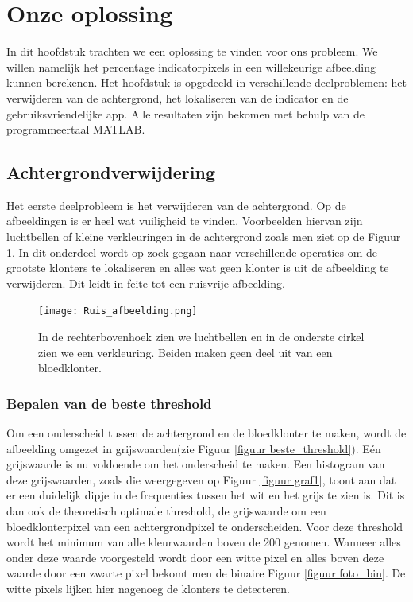 \documentclass[a4paper,kulak]{kulakarticle}
\begin{document}
\section{Onze oplossing}
In dit hoofdstuk trachten we een oplossing te vinden voor ons probleem. We willen namelijk het percentage indicatorpixels in een willekeurige afbeelding kunnen berekenen. Het hoofdstuk is opgedeeld in verschillende deelproblemen: het verwijderen van de achtergrond, het lokaliseren van de indicator en de gebruiksvriendelijke app. Alle resultaten zijn bekomen met behulp van de programmeertaal MATLAB.\cite{matlab}


\subsection{Achtergrondverwijdering} \label{Achtergrondverwijdering}
Het eerste deelprobleem is het verwijderen van de achtergrond. Op de afbeeldingen is er heel wat vuiligheid te vinden. Voorbeelden hiervan zijn luchtbellen of kleine verkleuringen in de achtergrond zoals men ziet op de Figuur \ref{figuur achtergrondverwijdering}. In dit onderdeel wordt op zoek gegaan naar verschillende operaties om de grootste klonters te lokaliseren en alles wat geen klonter is uit de afbeelding te verwijderen. Dit leidt in feite tot een ruisvrije afbeelding.

\begin{figure}[H]
	\centering
	\texttt{[image: Ruis\_afbeelding.png]}	
	\caption{In de rechterbovenhoek zien we luchtbellen en in de onderste cirkel zien we een verkleuring. Beiden maken geen deel uit van een bloedklonter.}
	\label{figuur achtergrondverwijdering}
\end{figure}

\subsubsection{Bepalen van de beste threshold}
Om een onderscheid tussen de achtergrond en de bloedklonter te maken, wordt de afbeelding omgezet in grijswaarden(zie Figuur \ref{figuur beste_threshold}). Eén grijswaarde is nu voldoende om het onderscheid te maken. Een histogram van deze grijswaarden, zoals die weergegeven op Figuur \ref{figuur graf1}, toont aan dat er een duidelijk dipje in de frequenties tussen het wit en het grijs te zien is. Dit is dan ook de theoretisch optimale threshold, de grijswaarde om een bloedklonterpixel van een achtergrondpixel te onderscheiden. Voor deze threshold wordt het minimum van alle kleurwaarden boven de 200 genomen. Wanneer alles onder deze waarde voorgesteld wordt door een witte pixel en alles boven deze waarde door een zwarte pixel bekomt men de binaire Figuur \ref{figuur foto_bin}. De witte pixels lijken hier nagenoeg de klonters te detecteren.
\end{document}
